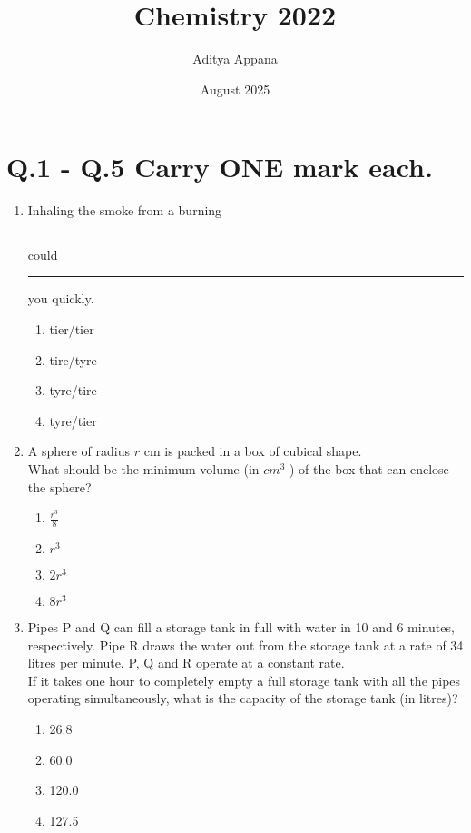\documentclass[12pt]{article}
\title{Chemistry 2022}
\author{Aditya Appana }
\date{August 2025}
\begin{document}
\maketitle
\section*{Q.1 - Q.5 Carry ONE mark each.}

\begin{enumerate}
    \item Inhaling the smoke from a burning \rule{2cm}{0.15mm} could \rule{2cm}{0.15mm} you quickly.
    \begin{enumerate}
        \item tier/tier
        \item tire/tyre
        \item tyre/tire
        \item tyre/tier
    \end{enumerate}

    \item A sphere of radius $r$ cm is packed in a box of cubical shape. \\  
    
         What should be the minimum volume (in $cm^3$ ) of the box that can enclose the
        sphere?

        \begin{enumerate}
            \item ${\frac{r^3}{8}}$
            \item $r^3$
            \item $2r^3$
            \item $8r^3$
         \end{enumerate}

    \item Pipes P and Q can fill a storage tank in full with water in 10 and 6 minutes,
respectively. Pipe R draws the water out from the storage tank at a rate of 34
litres per minute. P, Q and R operate at a constant rate. \\

If it takes one hour to completely empty a full storage tank with all the pipes
operating simultaneously, what is the capacity of the storage tank (in litres)?

\begin{enumerate}
\item 26.8
\item 60.0
\item 120.0
\item 127.5
\end{enumerate}


\end{enumerate}
\end{document}
